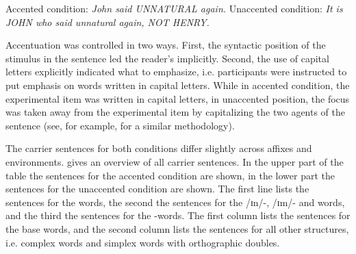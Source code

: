 \begin{exe} 
	\ex \label{example accented condition} Accented condition:  \hspace*{.5cm}\textit{John said UNNATURAL again.}
	\ex \label{example unaccented condition} Unaccented condition: \hspace*{0cm} \textit{It is JOHN who said unnatural again, NOT HENRY.}
\end{exe}\largerpage

Accentuation was controlled in two ways. First, the syntactic position of the stimulus in the sentence led the reader's  implicitly. Second, the use of capital letters explicitly indicated what to emphasize,  i.e. participants were instructed to put emphasis on words written in capital letters. While in accented condition, the experimental item was written in capital letters, in unaccented position, the focus was taken away from the experimental item by capitalizing  the two agents of the sentence (see, for example, \cite{Plag.2011} for a similar methodology).


The carrier sentences for both conditions differ slightly across affixes and environments.  gives an overview of all carrier sentences. In the upper part of the table the sentences for the accented condition are shown, in the lower part the sentences for the unaccented condition are shown. 
The first line lists the sentences for the words, the second the sentences for the /ɪn/-, /ɪm/- and words, and the third the sentences for the -words.
The first column lists the sentences for the base words, and the second column lists the sentences for all other structures, i.e. complex words and simplex words with orthographic doubles. 

